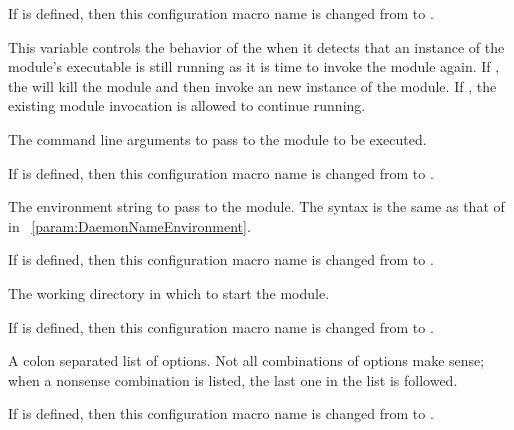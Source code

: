 \begin{description}
  If 
  is defined, then this configuration macro name is changed from
   to
  .

  This variable controls the behavior of the  when it
  detects that an instance of the module's executable is still running
  as it is time to invoke the module again.
  If , the  will kill the module and then invoke
  an new instance of the module.
  If , the existing module invocation is allowed to
  continue running. 

\label{param:StartdCronModuleArgs}
\item[\Macro{STARTD\_CRON\_<ModuleName>\_ARGS}]
  The command line arguments to pass to the module to be executed. 

  If 
  is defined, then this configuration macro name is changed from
   to
  .

\label{param:StartdCronModuleEnv}
\item[\Macro{STARTD\_CRON\_<ModuleName>\_ENV}]
  The environment string to pass to the module.
  The syntax is the same as that of 
   in ~\ref{param:DaemonNameEnvironment}.

  If 
  is defined, then this configuration macro name is changed from
   to
  .

\label{param:StartdCronModuleCwd}
\item[\Macro{STARTD\_CRON\_<ModuleName>\_CWD}]
  The working directory in which to start the module.

  If 
  is defined, then this configuration macro name is changed from
   to
  .

\label{param:StartdCronModuleOptions}
\item[\Macro{STARTD\_CRON\_<ModuleName>\_OPTIONS}]
  A colon separated list of options. 
  Not all combinations of options make sense;
  when a nonsense combination is listed,
  the last one in the list is followed.

  If 
  is defined, then this configuration macro name is changed from
   to
  .


\end{description}
